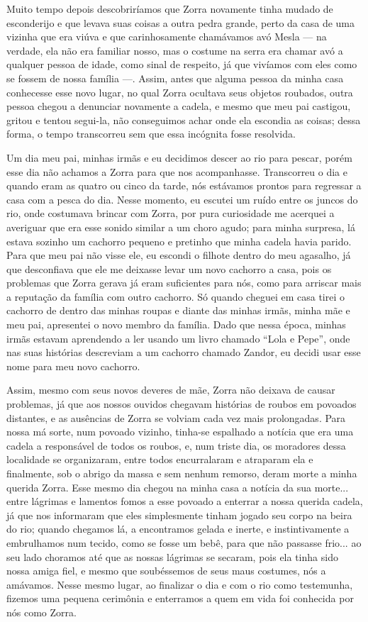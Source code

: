 Muito tempo depois descobriríamos que Zorra novamente tinha mudado de esconderijo e que levava suas coisas a outra pedra grande, perto da casa de uma vizinha que era viúva e que carinhosamente chamávamos avó Mesla --- na verdade, ela não era familiar nosso, mas o costume na serra era chamar avó a qualquer pessoa de idade, como sinal de respeito, já que vivíamos com eles como se fossem de nossa família ---.
Assim, antes que alguma pessoa da minha casa conhecesse esse novo lugar, no qual Zorra ocultava seus objetos roubados, outra pessoa chegou a denunciar novamente a cadela, e mesmo que meu pai castigou, gritou e tentou segui-la, não conseguimos achar onde ela escondia as coisas; dessa forma, o tempo transcorreu sem que essa incógnita fosse resolvida. 

Um dia meu pai, minhas irmãs e eu decidimos descer ao rio para pescar, porém esse dia não achamos a Zorra para que nos acompanhasse. Transcorreu o dia e quando eram as quatro ou cinco da tarde, nós estávamos prontos para regressar a casa com a pesca do dia. Nesse momento, eu escutei um ruído entre os juncos do rio, onde costumava brincar com Zorra, por pura curiosidade me acerquei a averiguar que era esse sonido similar a um choro agudo; para minha surpresa, lá estava sozinho um cachorro pequeno e pretinho que minha cadela havia parido.  
Para que meu pai não visse ele, eu escondi o filhote dentro do meu agasalho, já que desconfiava que ele me deixasse levar um novo cachorro a casa, pois os problemas que Zorra gerava já eram suficientes para nós, como para arriscar mais a reputação da família com outro cachorro.
Só quando cheguei em casa tirei o cachorro de dentro das minhas roupas e diante das minhas irmãs, minha mãe e meu pai, apresentei o novo membro da família. Dado que nessa época, minhas irmãs estavam aprendendo a ler usando um livro chamado ``Lola e Pepe'', onde nas suas histórias descreviam a um cachorro chamado Zandor, eu decidi usar esse nome para meu novo cachorro. 

Assim, mesmo com seus novos deveres de mãe, Zorra não deixava de causar problemas, já que aos nossos ouvidos chegavam histórias de roubos em povoados distantes, e as ausências de Zorra se volviam cada vez mais prolongadas.
Para nossa má sorte, num povoado vizinho, tinha-se espalhado a notícia que era uma cadela a responsável de todos os roubos, e, num triste dia, os moradores dessa localidade se organizaram, entre todos encurralaram e atraparam ela e finalmente, sob o abrigo da massa e sem nenhum remorso, deram morte a minha querida Zorra.
Esse mesmo dia chegou na minha casa a notícia da sua morte... entre lágrimas e lamentos fomos a esse povoado a enterrar a nossa querida cadela, já que nos informaram que eles simplesmente tinham jogado seu corpo na beira do rio; quando chegamos lá, a encontramos gelada e inerte, e instintivamente a embrulhamos num tecido, como se fosse um bebê, para que não passasse frio... ao seu lado choramos até que as nossas lágrimas se secaram, pois ela tinha sido nossa amiga fiel, e mesmo que soubéssemos de  seus maus costumes, nós a amávamos.
Nesse mesmo lugar, ao finalizar o dia e com o rio como testemunha, fizemos uma pequena cerimônia e enterramos a quem em vida foi conhecida por nós como Zorra. 

